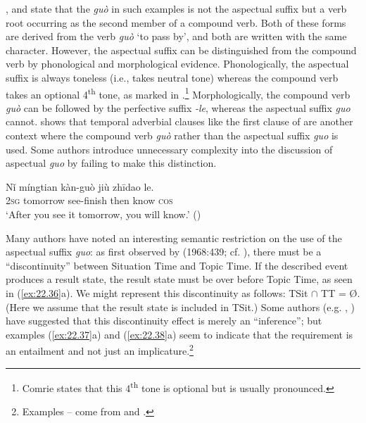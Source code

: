 \citet[251]{Chao1968}, \citet[59]{Comrie1976} and \citet[139ff.]{XiaoMcEnery2004} state that the \textit{guò} in such examples is not the aspectual suffix but a verb root occurring as the second member of a compound verb. Both of these forms are derived from the verb \textit{guò} ‘to pass by’, and both are written with the same  character. However, the aspectual suffix can be distinguished from the compound verb by phonological and morphological evidence. Phonologically, the aspectual suffix is always toneless (i.e., takes neutral tone) whereas the compound verb takes an optional 4\textsuperscript{th} tone, as marked in .\footnote{Comrie states that this 4\textsuperscript{th} tone is optional but is usually pronounced.} Morphologically, the compound verb \textit{guò} can be followed by the perfective suffix \textit{-le}, whereas the aspectual suffix \textit{guo} cannot. \citet[39--40]{Chu1998} shows that temporal adverbial clauses like the first clause of  are another context where the compound verb \textit{guò} rather than the aspectual suffix \textit{guo} is used. Some authors introduce unnecessary complexity into the discussion of aspectual \textit{guo} by failing to make this distinction.


\ea \label{ex:22.35}
\gll Nǐ  míngtian  kàn-guò  jiù  zhīdao  le.\\
\textsc{2sg}  tomorrow  see-finish  then  know  \textsc{cos}\\
\glt ‘After you see it tomorrow, you will know.’  (\citealt{Chen1979})
\z


Many authors have noted an interesting semantic restriction on the use of the aspectual suffix \textit{guo}: as first observed by \citeauthor{Chao1968} (1968:439; cf. \citealt{Yeh1996}), there must be a “discontinuity” between Situation Time and Topic Time. If the described event produces a result state, the result state must be over before Topic Time, as seen in (\ref{ex:22.36}a). We might represent this discontinuity as follows: TSit ${\cap}$ TT = \O. (Here we assume that the result state is included in TSit.) Some authors (e.g. \citealt{Iljic1990}, \citealt{Yeh1996}) have suggested that this discontinuity effect is merely an “inference”; but examples (\ref{ex:22.37}a) and (\ref{ex:22.38}a) seem to indicate that the requirement is an entailment and not just an implicature.\footnote{Examples -- come from \citet[18, 25]{Ma1977} and \citet{Chao1968}.}


